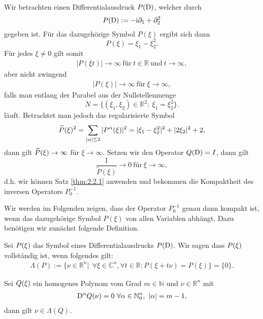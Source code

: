 \begin{exa}
Wir betrachten einen Differentialausdruck $P(\mathrm D)$, welcher durch
\begin{equation}
P(\mathrm D) := -\mathrm i\partial_1 + \partial_2^2
\end{equation}
gegeben ist. Für das dazugehörige Symbol $P(\xi)$ ergibt sich dann
\begin{equation}
P(\xi) = \xi_1 - \xi_2^2.
\end{equation}
Für jedes $\xi \not = 0$ gilt somit
\begin{align}
|P(\xi t)| \rightarrow \infty \ \text{für} \ t\in \mathbb{R} \ \text{und} \ t \rightarrow \infty,
\end{align}
aber nicht zwingend
\begin{align}
|P(\xi)| \rightarrow \infty \ \text{für} \ \xi \rightarrow \infty,
\end{align}
falls man entlang der Parabel aus der Nullstellenmenge\begin{equation}
N= \{ (\xi_1,\xi_2)\in \mathbb{R}^2 : \ \xi_1 = \xi_2^2 \}.
\end{equation}
läuft. Betrachtet man jedoch das regularisierte Symbol
\begin{equation}
\widetilde{P}(\xi)^2 = \sum_{|\alpha| \leq 2} |P^{\alpha}(\xi)|^2 = |\xi_1 - \xi_2^2|^2 + |2\xi_2|^2 + 2,
\end{equation}
dann gilt $\widetilde{P}(\xi) \rightarrow \infty$ für $\xi \rightarrow \infty$. Setzen wir den Operator $Q(\mathrm D)=I$, dann gilt
\begin{equation}
\frac{1}{\tilde{P}(\xi)} \rightarrow 0 \ \text{für} \ \xi \rightarrow \infty,
\end{equation}
d.h. wir können Satz \ref{thm:2:2.1} anwenden und bekommen die Kompaktheit des inversen Operators $P_0^{-1}$.
\end{exa}
Wir werden im Folgenden zeigen, dass der Operator $P_0^{-1}$ genau dann kompakt ist, wenn das dazugehörige Symbol $P(\xi)$ von allen Variablen abhängt. Dazu benötigen wir zunächst folgende Definition.
\begin{df}
\item Sei $P(\xi)$ das Symbol eines Differentialausdrucks $P(\mathrm D)$. Wir sagen dass $P(\xi)$ vollständig ist, wenn folgendes gilt:
\begin{align*}
\Lambda(P):=\{ \nu \in \mathbb{R}^n| \ \ \forall \xi \in \mathbb{C}^n, \forall t \in \mathbb{R}: P(\xi + t\nu) = P(\xi)  \} = \{0\}.
\end{align*}
\end{df}
\begin{lem}\label{Lema:homogene Polynome} Sei $Q(\xi)$ ein homogenes Polynom vom Grad $m \in \mathbb{N}$ und  $\nu \in \mathbb{R}^n$ mit
\begin{align*}
\mathrm D^{\alpha}Q(\nu)=0 \ \forall \alpha \in \mathbb{N}_0^{n}, \ |\alpha| = m-1,
\end{align*}
dann gilt $\nu \in \Lambda(Q)$.
\end{lem}

